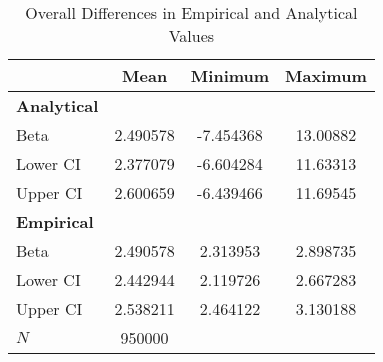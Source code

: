 \begin{table}[htbp]\centering
\def\sym#1{\ifmmode^{#1}\else\(^{#1}\)\fi}
\caption{Overall Differences in Empirical and Analytical Values}
\begin{tabular}{l*{1}{ccc}}
\hline\hline
            &        Mean&     Minimum&     Maximum\\
\hline
\textbf{Analytical}&            &            &            \\
Beta        &    2.490578&   -7.454368&    13.00882\\
Lower CI    &    2.377079&   -6.604284&    11.63313\\
Upper CI    &    2.600659&   -6.439466&    11.69545\\
\hline \textbf{Empirical}&            &            &            \\
Beta        &    2.490578&    2.313953&    2.898735\\
Lower CI    &    2.442944&    2.119726&    2.667283\\
Upper CI    &    2.538211&    2.464122&    3.130188\\
\hline
\(N\)       &      950000&            &            \\
\hline\hline
\end{tabular}
\end{table}
